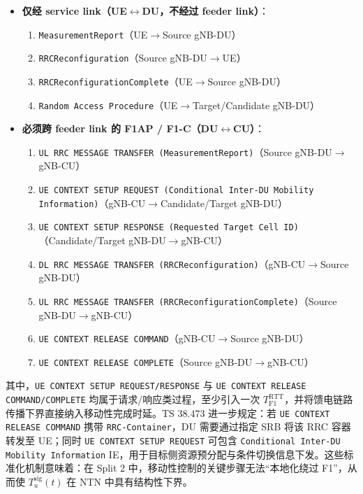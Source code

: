 \documentclass[type=master]{fduthesis}
\begin{document}
\begin{itemize}
  \item \textbf{仅经 service link（UE$\leftrightarrow$DU，不经过 feeder link）}：
  \begin{enumerate}
    \item \texttt{MeasurementReport}（UE$\rightarrow$Source gNB-DU）
    \item \texttt{RRCReconfiguration}（Source gNB-DU$\rightarrow$UE）
    \item \texttt{RRCReconfigurationComplete}（UE$\rightarrow$Source gNB-DU）
    \item \texttt{Random Access Procedure}（UE$\rightarrow$Target/Candidate gNB-DU）
  \end{enumerate}

  \item \textbf{必须跨 feeder link 的 F1AP / F1-C（DU$\leftrightarrow$CU）}：
  \begin{enumerate}
    \item \texttt{UL RRC MESSAGE TRANSFER (MeasurementReport)}（Source gNB-DU$\rightarrow$gNB-CU）
    \item \texttt{UE CONTEXT SETUP REQUEST (Conditional Inter-DU Mobility Information)}（gNB-CU$\rightarrow$Candidate/Target gNB-DU）
    \item \texttt{UE CONTEXT SETUP RESPONSE (Requested Target Cell ID)}（Candidate/Target gNB-DU$\rightarrow$gNB-CU）
    \item \texttt{DL RRC MESSAGE TRANSFER (RRCReconfiguration)}（gNB-CU$\rightarrow$Source gNB-DU）
    \item \texttt{UL RRC MESSAGE TRANSFER (RRCReconfigurationComplete)}（Source gNB-DU$\rightarrow$gNB-CU）
    \item \texttt{UE CONTEXT RELEASE COMMAND}（gNB-CU$\rightarrow$Source gNB-DU）
    \item \texttt{UE CONTEXT RELEASE COMPLETE}（Source gNB-DU$\rightarrow$gNB-CU）
  \end{enumerate}
\end{itemize}

其中，\texttt{UE CONTEXT SETUP REQUEST/RESPONSE} 与 \texttt{UE CONTEXT RELEASE COMMAND/COMPLETE} 均属于请求/响应类过程，至少引入一次 $T_{\mathrm{F1}}^{\mathrm{RTT}}$，并将馈电链路传播下界直接纳入移动性完成时延。TS 38.473 进一步规定：若 \texttt{UE CONTEXT RELEASE COMMAND} 携带 \texttt{RRC-Container}，DU 需要通过指定 SRB 将该 RRC 容器转发至 UE；同时 \texttt{UE CONTEXT SETUP REQUEST} 可包含 \texttt{Conditional Inter-DU Mobility Information} IE，用于目标侧资源预分配与条件切换信息下发。这些标准化机制意味着：在 Split 2 中，移动性控制的关键步骤无法“本地化绕过 F1”，从而使 $T_{u}^{\mathrm{sig}}(t)$ 在 NTN 中具有结构性下界。
\end{document}
